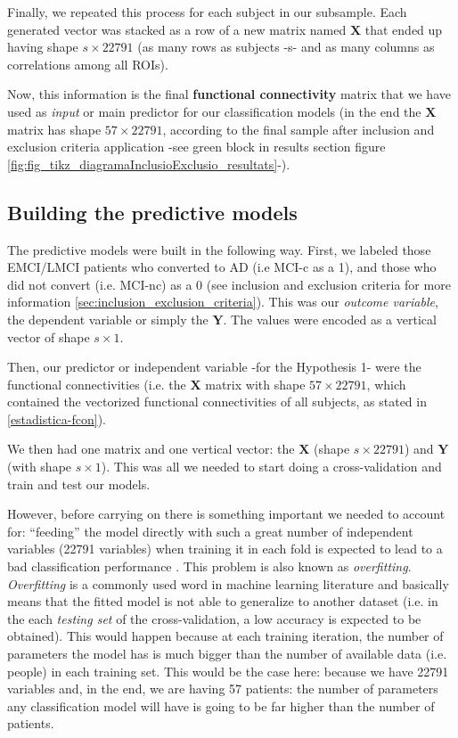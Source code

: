\documentclass[a4paper,12pt]{elsarticle}  %
\begin{document}
Finally, we repeated this process for each subject in our subsample. Each generated vector was stacked as a row of a new matrix named $\textbf{X}$ that ended up having shape $s \times 22791$ (as many rows as subjects -s- and as many columns as correlations among all ROIs).

Now, this information is the final \textbf{functional connectivity} matrix that we have used as \textit{input} or main predictor for our classification models (in the end the $\textbf{X}$ matrix has shape $57 \times 22791$, according to the final sample after inclusion and exclusion criteria application -see green block in results section figure \ref{fig:fig_tikz_diagramaInclusioExclusio_resultats}-).

\subsection{Building the predictive models}

The predictive models were built in the following way. First, we labeled those EMCI/LMCI patients who converted to AD (i.e MCI-c as a 1), and those who did not convert (i.e. MCI-nc) as a 0 (see inclusion and exclusion criteria for more information \ref{sec:inclusion_exclusion_criteria}). This was our \textit{outcome variable}, the dependent variable or simply the $\textbf{Y}$. The values were encoded as a vertical vector of shape $s \times 1$.

Then, our predictor or independent variable -for the Hypothesis 1- were the functional connectivities (i.e. the $\textbf{X}$ matrix with shape $57 \times 22791$, which contained the vectorized functional connectivities of all subjects, as stated in \ref{estadistica-fcon}).

We then had one matrix and one vertical vector: the $\textbf{X}$ (shape $s \times 22791$) and $\textbf{Y}$ (with shape $s \times 1$). This was all we needed to start doing a cross-validation and train and test our models.

However, before carrying on there is something important we needed to account for: ``feeding'' the model directly with such a great number of independent variables (22791 variables) when training it in each fold is expected to lead to a bad classification performance \cite{Shen2014147}. This problem is also known as \textit{overfitting}. \textit{Overfitting} is a commonly used word in machine learning literature and basically means that the fitted model is not able to generalize to another dataset (i.e. in the each \textit{testing set} of the cross-validation, a low accuracy is expected to be obtained). This would happen because at each training iteration, the number of parameters the model has is much bigger than the number of available data (i.e. people) in each training set. This would be the case here: because we have 22791 variables and, in the end, we are having 57 patients: the number of parameters any classification model will have is going to be far higher than the number of patients.
\end{document}
